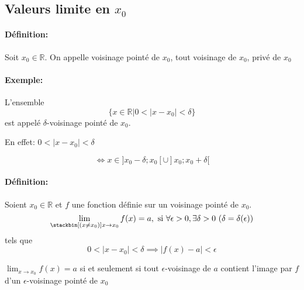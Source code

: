 \documentclass[
    11pt,
    a4paper,
    oneside,
    headinlcude, footinclude,
    twoside,
]{report}
\begin{document}
\subsection{Valeurs limite en $x_{0}$ }
\label{sub:valeurs_limite_en_x__0_}


\paragraph{Définition:}

Soit $x_{0} \in \mathbb{R}$. On appelle voisinage pointé de $x_{0}$, tout
voisinage de $x_{0}$, privé de $x_{0}$

\paragraph{Exemple:}

L'ensemble
$$\{ x \in \mathbb{R} | 0 < |x - x_{0}| < \delta \}$$
est appelé $\delta$-voisinage pointé de $x_{0}$.

En effet: $0 < |x - x_{0}| < \delta$ 

$$\iff x \in ]x_{0} - \delta; x_{0}[ \cup ]x_{0}; x_{0} + \delta[$$

\paragraph{Définition:}

Soient $x_{0} \in \mathbb{R}$ et $f$ une fonction définie sur un voisinage
pointé de $x_{0}$. $$ \lim_{\stackbin[(x \neq x_{0})]{}{x \to x_{0}}} f(x) = a, \text{ si } \forall \epsilon
> 0, \exists \delta > 0\ (\delta = \delta(\epsilon))$$ tels que $$0 < |x -
x_{0}| < \delta \implies |f(x) - a| < \epsilon$$

$ \lim_{x \to x_{0}} f(x) = a $ si et seulement si tout $\epsilon$-voisinage de $a$ contient
l'image par $f$ d'un $\epsilon$-voisinage pointé de $x_{0}$ 
\end{document}
